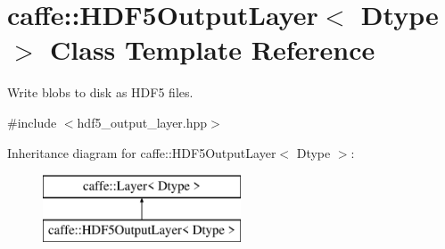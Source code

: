 \hypertarget{classcaffe_1_1HDF5OutputLayer}{}\section{caffe\+:\+:H\+D\+F5\+Output\+Layer$<$ Dtype $>$ Class Template Reference}
\label{classcaffe_1_1HDF5OutputLayer}


Write blobs to disk as H\+D\+F5 files.  




{\ttfamily \#include $<$hdf5\+\_\+output\+\_\+layer.\+hpp$>$}

Inheritance diagram for caffe\+:\+:H\+D\+F5\+Output\+Layer$<$ Dtype $>$\+:\begin{figure}[H]
\begin{center}
\leavevmode
\includegraphics[height=2.000000cm]{classcaffe_1_1HDF5OutputLayer}
\end{center}
\end{figure}
